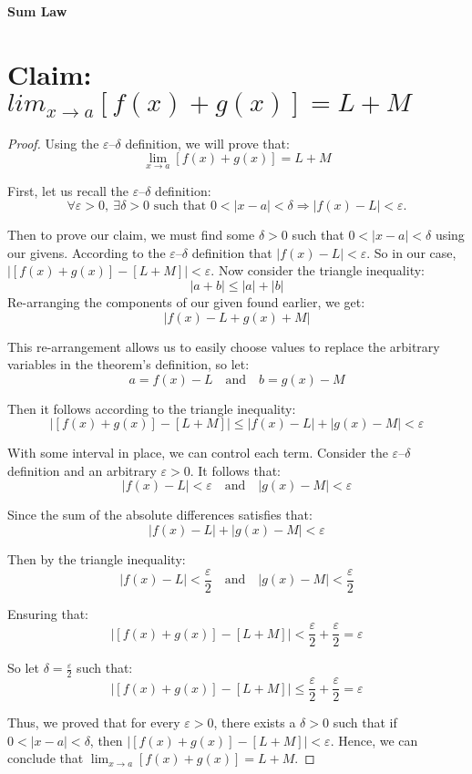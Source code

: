 \documentclass{article}
\begin{document}
	
\textbf{Sum Law}
\section*{Claim: $lim_{x \to a} [f(x) + g(x)] = L + M$}

\begin{proof}

Using the $\varepsilon$–$\delta$ definition, we will prove that: 
\[
\lim_{x \to a} [f(x) + g(x)] = L + M
\]

First, let us recall the $\varepsilon$–$\delta$ definition:
\[
\forall \varepsilon > 0, \ \exists \delta > 0 \text{ such that } 0 < |x - a| < \delta \Rightarrow \left|f(x) - L\right| < \varepsilon.
\]

Then to prove our claim, we must find some $\delta > 0$ such that $0 < |x - a| < \delta$ using our givens. According to the $\varepsilon$–$\delta$ definition that $\left|f(x) - L\right| < \varepsilon$. So in our case, $\left|[f(x) + g(x)] - [L + M]\right| < \varepsilon$.
Now consider the triangle inequality:
\[
|a + b| \leq |a| + |b|
\]
Re-arranging the components of our given found earlier, we get:
\[
\left| f(x) - L + g(x) + M \right|
\]


This re-arrangement allows us to easily choose values to replace the arbitrary variables in the theorem's definition, so let:
\[
a = f(x) - L \quad \text{and} \quad b = g(x) - M
\]


Then it follows according to the triangle inequality:
\[
\left| [f(x) + g(x)] - [L + M] \right| \leq |f(x) - L| + |g(x) - M| < \varepsilon
\]


With some interval in place, we can control each term.
Consider the $\varepsilon$–$\delta$ definition and an arbitrary $\varepsilon > 0$. It follows that: 
\[
|f(x) - L| < \varepsilon \quad \text{and} \quad |g(x) - M| < \varepsilon
\]


Since the sum of the absolute differences satisfies that:
\[
|f(x) - L| + |g(x) - M| < \varepsilon
\]


Then by the triangle inequality:
\[
|f(x) - L| < \frac{\varepsilon}{2} \quad \text{and} \quad |g(x) - M| < \frac{\varepsilon}{2}
\]


Ensuring that:
\[
\left| [f(x) + g(x)] - [L + M] \right| < \frac{\varepsilon}{2} + \frac{\varepsilon}{2} = \varepsilon
\]


So let $\delta = \frac{\varepsilon}{2}$ such that:
\[
\left| [f(x) + g(x)] - [L + M] \right| \leq \frac{\varepsilon}{2} + \frac{\varepsilon}{2} = \varepsilon
\]

Thus, we proved that for every $\varepsilon > 0$, there exists a $\delta > 0$ such that if $0 < |x - a| < \delta$, then $\left| [f(x) + g(x)] - [L + M] \right| < \varepsilon$.
Hence, we can conclude that $\lim_{x \to a} [f(x) + g(x)] = L + M$.

\end{proof}
\end{document}
